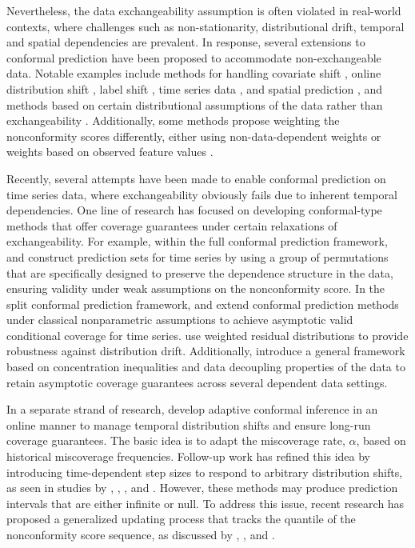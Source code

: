 \documentclass[
  11pt,
  a4paper,
]{article}
\theoremstyle{plain}
\theoremstyle{remark}
\begin{document}
Nevertheless, the data exchangeability assumption is often violated in
real-world contexts, where challenges such as non-stationarity,
distributional drift, temporal and spatial dependencies are prevalent.
In response, several extensions to conformal prediction have been
proposed to accommodate non-exchangeable data. Notable examples include
methods for handling covariate shift
\autocite{tibshirani2019,lei2021,yang2024}, online distribution shift
\autocite{gibbs2021,zaffran2022,bastani2022}, label shift
\autocite{podkopaev2021}, time series data
\autocite{chernozhukov2018,gibbs2021,xu2021,xu2023,zaffran2022}, and
spatial prediction \autocite{mao2024}, and methods based on certain
distributional assumptions of the data rather than exchangeability
\autocite{oliveira2024,xu2021,xu2023}. Additionally, some methods
propose weighting the nonconformity scores differently, either using
non-data-dependent weights \autocite{barber2023} or weights based on
observed feature values \autocite{tibshirani2019,guan2023,hore2023}.

Recently, several attempts have been made to enable conformal prediction
on time series data, where exchangeability obviously fails due to
inherent temporal dependencies. One line of research has focused on
developing conformal-type methods that offer coverage guarantees under
certain relaxations of exchangeability. For example, within the full
conformal prediction framework, \textcite{chernozhukov2018} and
\textcite{yu2022} construct prediction sets for time series by using a
group of permutations that are specifically designed to preserve the
dependence structure in the data, ensuring validity under weak
assumptions on the nonconformity score. In the split conformal
prediction framework, \textcite{xu2021} and \textcite{xu2023} extend
conformal prediction methods under classical nonparametric assumptions
to achieve asymptotic valid conditional coverage for time series.
\textcite{barber2023} use weighted residual distributions to provide
robustness against distribution drift. Additionally,
\textcite{oliveira2024} introduce a general framework based on
concentration inequalities and data decoupling properties of the data to
retain asymptotic coverage guarantees across several dependent data
settings.

In a separate strand of research, \textcite{gibbs2021} develop adaptive
conformal inference in an online manner to manage temporal distribution
shifts and ensure long-run coverage guarantees. The basic idea is to
adapt the miscoverage rate, \(\alpha\), based on historical miscoverage
frequencies. Follow-up work has refined this idea by introducing
time-dependent step sizes to respond to arbitrary distribution shifts,
as seen in studies by \textcite{bastani2022}, \textcite{zaffran2022},
\textcite{gibbs2024}, and \textcite{angelopoulos2024online}. However,
these methods may produce prediction intervals that are either infinite
or null. To address this issue, recent research has proposed a
generalized updating process that tracks the quantile of the
nonconformity score sequence, as discussed by \textcite{bhatnagar2023},
\textcite{angelopoulos2024}, and \textcite{angelopoulos2024online}.
\end{document}
